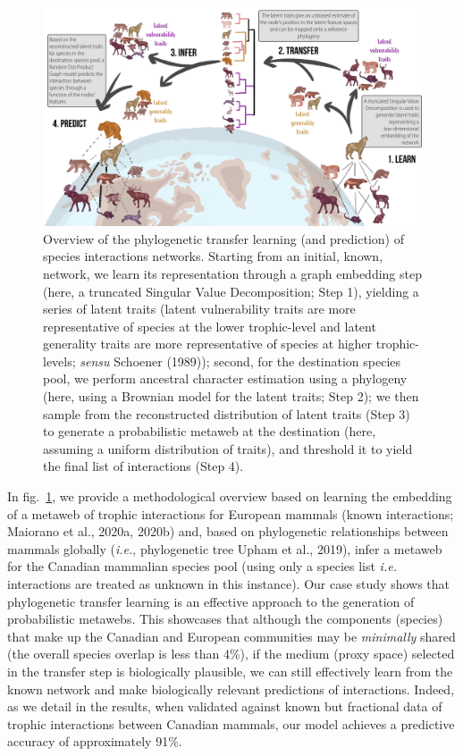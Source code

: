 \documentclass[11pt]{article}
\makeatletter
\def\maxwidth{\ifdim\Gin@nat@width>\linewidth\linewidth
\else\Gin@nat@width\fi}
\let\Oldincludegraphics\includegraphics
\renewcommand{\includegraphics}[1]{\Oldincludegraphics[width=\maxwidth]{#1}}
\makeatother
\begin{document}
\begin{figure}
\hypertarget{fig:concept}{%
\centering
\includegraphics{figures/figure-concept_v2.png}
\caption{Overview of the phylogenetic transfer learning (and prediction)
of species interactions networks. Starting from an initial, known,
network, we learn its representation through a graph embedding step
(here, a truncated Singular Value Decomposition; Step 1), yielding a
series of latent traits (latent vulnerability traits are more
representative of species at the lower trophic-level and latent
generality traits are more representative of species at higher
trophic-levels; \emph{sensu} Schoener (1989)); second, for the
destination species pool, we perform ancestral character estimation
using a phylogeny (here, using a Brownian model for the latent traits;
Step 2); we then sample from the reconstructed distribution of latent
traits (Step 3) to generate a probabilistic metaweb at the destination
(here, assuming a uniform distribution of traits), and threshold it to
yield the final list of interactions (Step 4).}\label{fig:concept}
}
\end{figure}

In fig.~\ref{fig:concept}, we provide a methodological overview based on
learning the embedding of a metaweb of trophic interactions for European
mammals (known interactions; Maiorano et al., 2020a, 2020b) and, based
on phylogenetic relationships between mammals globally (\emph{i.e.},
phylogenetic tree Upham et al., 2019), infer a metaweb for the Canadian
mammalian species pool (using only a species list \emph{i.e.}
interactions are treated as unknown in this instance). Our case study
shows that phylogenetic transfer learning is an effective approach to
the generation of probabilistic metawebs. This showcases that although
the components (species) that make up the Canadian and European
communities may be \emph{minimally} shared (the overall species overlap
is less than 4\%), if the medium (proxy space) selected in the transfer
step is biologically plausible, we can still effectively learn from the
known network and make biologically relevant predictions of
interactions. Indeed, as we detail in the results, when validated
against known but fractional data of trophic interactions between
Canadian mammals, our model achieves a predictive accuracy of
approximately 91\%.
\end{document}
